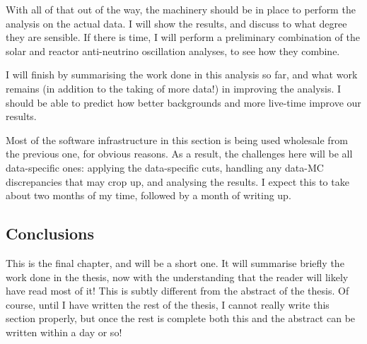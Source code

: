 With all of that out of the way, the machinery should be in place to perform the analysis on the actual data. I will show the results, and discuss to what degree they are sensible. If there is time, I will perform a preliminary combination of the solar and reactor anti-neutrino oscillation analyses, to see how they combine.

I will finish by summarising the work done in this analysis so far, and what work remains (in addition to the taking of more data!) in improving the analysis. I should be able to predict how better backgrounds and more live-time improve our results.

Most of the software infrastructure in this section is being used wholesale from the previous one, for obvious reasons. As a result, the challenges here will be all data-specific ones: applying the data-specific cuts, handling any data-MC discrepancies that may crop up, and analysing the results. I expect this to take about two months of my time, followed by a month of writing up.

\subsection{Conclusions}
This is the final chapter, and will be a short one. It will summarise briefly the work done in the thesis, now with the understanding that the reader will likely have read most of it! This is subtly different from the abstract of the thesis. Of course, until I have written the rest of the thesis, I cannot really write this section properly, but once the rest is complete both this and the abstract can be written within a day or so!